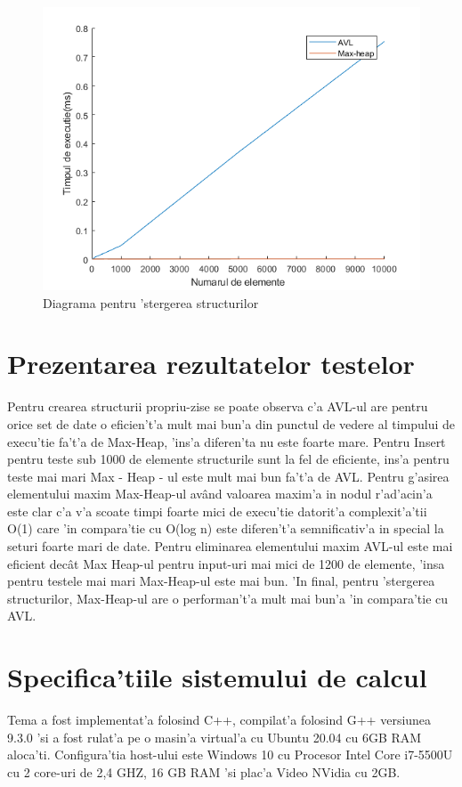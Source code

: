 \begin{figure}[ht]
\centering
\includegraphics[scale=0.8]{Fisiere/Del}
\caption {Diagrama pentru 'stergerea structurilor}
\end{figure}
\FloatBarrier

\section{Prezentarea rezultatelor testelor}
Pentru crearea structurii propriu-zise se poate observa c'a AVL-ul are pentru orice set de date o eficien't'a mult mai bun'a din punctul de vedere al timpului de execu'tie fa't'a de Max-Heap, 'ins'a diferen'ta nu este foarte mare. Pentru Insert pentru teste sub 1000 de elemente structurile sunt la fel de eficiente, ins'a pentru teste mai mari Max - Heap - ul este mult mai bun fa't'a de AVL. Pentru g'asirea elementului maxim Max-Heap-ul av\^and valoarea maxim'a in nodul r'ad'acin'a este clar c'a v'a scoate timpi foarte mici de execu'tie datorit'a complexit'a'tii O(1) care 'in compara'tie cu O(log n) este diferen't'a semnificativ'a in special la seturi foarte mari de date. Pentru eliminarea elementului maxim AVL-ul este mai eficient dec\^at Max Heap-ul pentru input-uri mai mici de 1200 de elemente, 'insa pentru testele mai mari Max-Heap-ul este mai bun. 'In final, pentru 'stergerea structurilor, Max-Heap-ul are o performan't'a mult mai bun'a 'in compara'tie cu AVL.

\section{Specifica'tiile sistemului de calcul}
Tema a fost implementat'a folosind C++, compilat'a folosind G++ versiunea 9.3.0 'si a fost rulat'a pe o masin'a virtual'a cu Ubuntu 20.04 cu 6GB RAM aloca'ti. Configura'tia host-ului este Windows 10 cu Procesor Intel Core i7-5500U cu 2 core-uri de 2,4 GHZ, 16 GB RAM 'si plac'a Video NVidia cu 2GB.